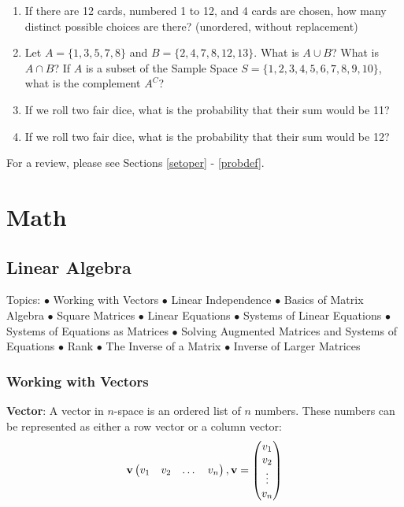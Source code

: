 \documentclass[]{book}
\providecommand{\tightlist}{%
  \setlength{\itemsep}{0pt}\setlength{\parskip}{0pt}}
\theoremstyle{definition}
\theoremstyle{definition}
\theoremstyle{definition}
\theoremstyle{remark}
\begin{document}
\begin{enumerate}
\def\labelenumi{\arabic{enumi}.}
\tightlist
\item
  If there are 12 cards, numbered 1 to 12, and 4 cards are chosen, how
  many distinct possible choices are there? (unordered, without
  replacement)
\item
  Let \(A = \{1,3,5,7,8\}\) and \(B = \{2,4,7,8,12,13\}\). What is
  \(A \cup B\)? What is \(A \cap B\)? If \(A\) is a subset of the Sample
  Space \(S = \{1,2,3,4,5,6,7,8,9,10\}\), what is the complement
  \(A^C\)?
\item
  If we roll two fair dice, what is the probability that their sum would
  be 11?
\item
  If we roll two fair dice, what is the probability that their sum would
  be 12?
\end{enumerate}

For a review, please see Sections \ref{setoper} - \ref{probdef}.

\part{Math}\label{part-math}

\chapter{Linear Algebra}\label{linearalgebra}

Topics: \(\bullet\) Working with Vectors \(\bullet\) Linear Independence
\(\bullet\) Basics of Matrix Algebra \(\bullet\) Square Matrices
\(\bullet\) Linear Equations \(\bullet\) Systems of Linear Equations
\(\bullet\) Systems of Equations as Matrices \(\bullet\) Solving
Augmented Matrices and Systems of Equations \(\bullet\) Rank \(\bullet\)
The Inverse of a Matrix \(\bullet\) Inverse of Larger Matrices

\section{Working with Vectors}\label{vector-def}

\textbf{Vector}: A vector in \(n\)-space is an ordered list of \(n\)
numbers. These numbers can be represented as either a row vector or a
column vector:
\[ {\bf v} \begin{pmatrix} v_1 & v_2 & \dots & v_n\end{pmatrix} , {\bf v} = \begin{pmatrix} v_1 \\ v_2 \\ \vdots \\ v_n \end{pmatrix}\]
\end{document}
